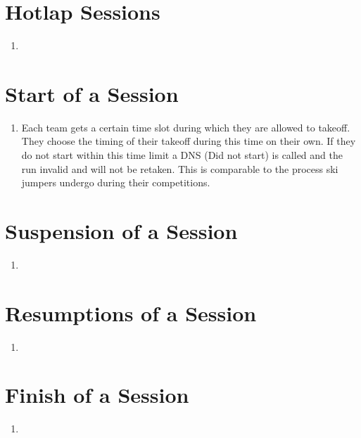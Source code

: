     \section{Hotlap Sessions}
    \begin{enumerate}
      \item 
    \end{enumerate}

    \section{Start of a Session}
    \begin{enumerate}
      \item Each team gets a certain time slot during which they are allowed to takeoff. They choose the timing of their takeoff during this time on their own. If they do not start within this time limit a DNS (Did not start) is called and the run invalid and will not be retaken. This is comparable to the process ski jumpers undergo during their competitions. 
    \end{enumerate}

    \section{Suspension of a Session}
    \begin{enumerate}
      \item 
    \end{enumerate}

    \section{Resumptions of a Session }
    \begin{enumerate}
      \item 
    \end{enumerate}

    \section{Finish of a Session}
    \begin{enumerate}
      \item 
    \end{enumerate}

